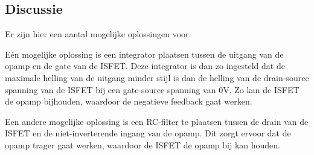 \subsection{Discussie}
Er zijn hier een aantal mogelijke oplossingen voor.

Eén mogelijke oplossing is een integrator plaatsen tussen de uitgang van de opamp en de gate van de ISFET. Deze integrator is dan zo ingesteld dat de maximale helling van de uitgang minder stijl is dan de helling van de drain-source spanning van de ISFET bij een gate-source spanning van 0V. Zo kan de ISFET de opamp bijhouden, waardoor de negatieve feedback gaat werken.

Een andere mogelijke oplossing is een RC-filter te plaatsen tussen de drain van de ISFET en de niet-inverterende ingang van de opamp. Dit zorgt ervoor dat de opamp trager gaat werken, waardoor de ISFET de opamp bij kan houden.
